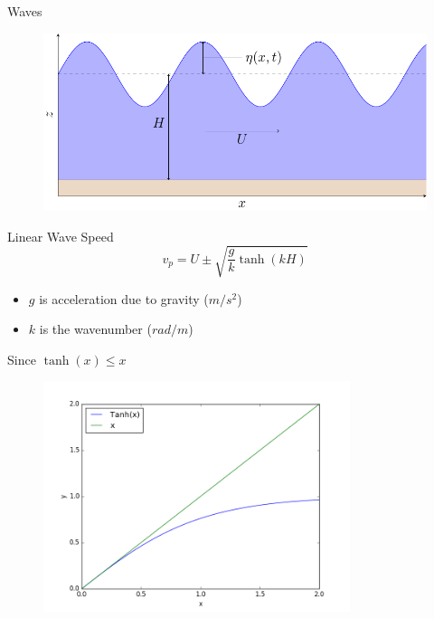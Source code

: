 \documentclass[handout]{beamer}
\begin{document}
\begin{frame}{Waves}
\begin{figure}
	\includegraphics[width=\textwidth]{./Figures/Latex/Wavetank.pdf}
\end{figure}	
\end{frame}

\begin{frame}{Linear Wave Speed}
\begin{equation*}
v_p = U \pm\sqrt{\frac{g}{k} \tanh\left(kH\right)}
\end{equation*}	
\begin{itemize}
	\item $g$ is acceleration due to gravity ($m/s^2$)
	\item $k$ is the wavenumber ($rad/m$)
\end{itemize}
\end{frame}

\begin{frame}{}
Since $\tanh\left(x\right) \le x$ \pause
\begin{figure}
	\includegraphics[width=0.8\textwidth]{./Figures/tanh.png}
\end{figure}	
\end{frame}
\end{document}
